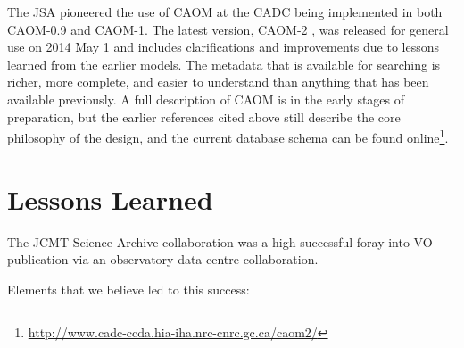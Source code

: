\documentclass[final,authoryear,5p,times,twocolumn]{elsarticle}
\begin{document}
The JSA pioneered the use of CAOM at the CADC being implemented in both
CAOM-0.9 and CAOM-1.  The latest version, CAOM-2
\citep{2013ASPC..475..159R,2012ASPC..461..339D},  was released for general
use on 2014 May 1 and includes clarifications and improvements due to
lessons learned from the earlier models.
The metadata that is available for searching is richer, more complete, and easier
to understand than anything that has been available previously.
A full description of CAOM is in the early stages of preparation, but the earlier
references cited above still describe the core philosophy of the design, and the
current database schema can be found online\footnote{\url{http://www.cadc-ccda.hia-iha.nrc-cnrc.gc.ca/caom2/}}.

\section{Lessons Learned}

The JCMT Science Archive collaboration was a high successful foray
into VO publication via an observatory-data centre collaboration.

Elements that we believe led to this success:
\end{document}
